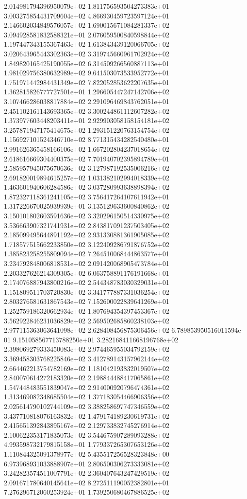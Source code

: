 2.014981794396950079e+02 1.811756593504273383e+01 3.003275854431709604e+02
4.866930459723597124e+01 2.146602034849576057e+02 1.690015671084281337e+02
3.094928581832588321e+01 2.076059500840598844e+02 1.197447343155367463e+02
1.613843439120066705e+02 3.020643965443302363e+02 3.319745660961702924e+02
1.849820165425190055e+02 6.314509266560887113e+01 1.981029756380632989e+02
9.641503073533952772e+01 1.751971442984431349e+02 7.822052853622207635e+01
1.362815826777727501e+01 1.296605447247142706e+02 3.107466286038817884e+02
2.291096469843762051e+01 2.451102161143693365e+02 3.300244861112607282e+02
1.373977603448203411e+01 2.929903058158154181e+02 3.257871947175414675e+02
1.293151220763154754e+02 1.156927101524346710e+02 8.771315434282540480e+01
2.991626365458166106e+02 1.667202804237018654e+02 2.618616669304400375e+02
7.701940702395894789e+01 2.585957945075670636e+02 3.127987192535006216e+02
2.691820019894615257e+02 1.031382102994018339e+02 1.463601940606284586e+02
3.037280993638898394e+02 1.872327118361241105e+02 3.756417264107611942e+01
1.317226670025939939e+01 3.135129633600840862e+02 3.150101802603591636e+02
3.320296150514330975e+02 3.536663907321741931e+02 2.843817091237503405e+02
2.185099495644891192e+02 2.931330881361905085e+02 1.718577515662233850e+02
3.122409286791876752e+02 1.385823258255809094e+02 7.264510068444863577e+01
3.234792848006818531e+02 2.091420068905473784e+01 2.203327626214309305e+02
6.063758891176191668e+01 2.174076887943800216e+02 2.544348783030329031e+01
1.151809511703720830e+02 3.341777887331036254e+02 2.803276581631867543e+02
7.152600022839641269e+01 1.252759186320662934e+02 1.807694354397453367e+02
3.562922846231036829e+02 2.569502685860238103e+02 2.977115363063641098e+02
2.628408456875306456e+02 6.789853950516011594e-01 9.151058567713788250e+01
3.282168411668196768e+02 2.398069279333450083e+02 2.974465955034792159e+02
3.369458303768225846e+02 3.412789143157962144e+02 2.664462213754782169e+02
1.181042193832019507e+02 2.840070614272183320e+02 2.198844488417065861e+02
1.547448483551839047e+02 2.914000920796474361e+02 1.313469082348685504e+02
1.377183054466906356e+02 2.025614790102744109e+02 3.388258697747346559e+02
3.437710818076163832e+02 1.479174189230619731e+02 2.415651392843895167e+02
2.129733832745276914e+02 2.100622353171835073e+02 3.544675907289093288e+02
4.993598732179815158e+01 1.779337265307653126e+02 1.110844325091378977e+02
5.435517256528323848e+00 6.973968931033888907e+01 2.806500306273333081e+02
3.242823574511007791e+02 2.360407643247429519e+02 2.091671780640145641e+02
8.272511190052382801e+01 7.276296712060253924e+01 1.739250680467886525e+02
